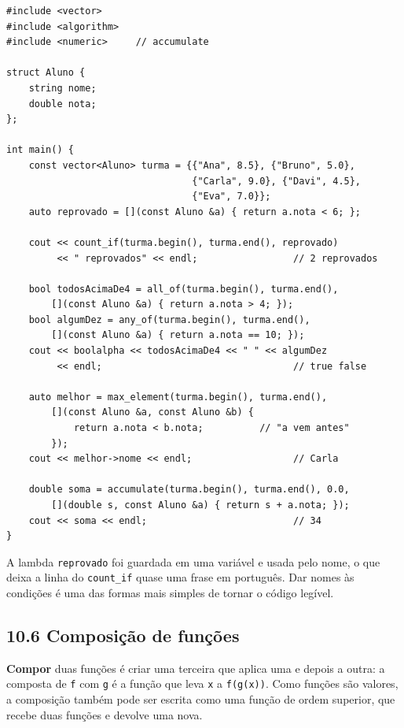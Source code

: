 \begin{codigo}
\begin{Verbatim}[breaklines=true, breaksymbolleft={}, fontsize=\footnotesize]
#include <vector>
#include <algorithm>
#include <numeric>     // accumulate

struct Aluno {
    string nome;
    double nota;
};

int main() {
    const vector<Aluno> turma = {{"Ana", 8.5}, {"Bruno", 5.0},
                                 {"Carla", 9.0}, {"Davi", 4.5},
                                 {"Eva", 7.0}};
    auto reprovado = [](const Aluno &a) { return a.nota < 6; };

    cout << count_if(turma.begin(), turma.end(), reprovado)
         << " reprovados" << endl;                 // 2 reprovados

    bool todosAcimaDe4 = all_of(turma.begin(), turma.end(),
        [](const Aluno &a) { return a.nota > 4; });
    bool algumDez = any_of(turma.begin(), turma.end(),
        [](const Aluno &a) { return a.nota == 10; });
    cout << boolalpha << todosAcimaDe4 << " " << algumDez
         << endl;                                  // true false

    auto melhor = max_element(turma.begin(), turma.end(),
        [](const Aluno &a, const Aluno &b) {
            return a.nota < b.nota;          // "a vem antes"
        });
    cout << melhor->nome << endl;                  // Carla

    double soma = accumulate(turma.begin(), turma.end(), 0.0,
        [](double s, const Aluno &a) { return s + a.nota; });
    cout << soma << endl;                          // 34
}
\end{Verbatim}
\end{codigo}

A lambda \texttt{reprovado} foi guardada em uma variável e usada pelo nome, o que deixa a linha do \texttt{count\_if} quase uma frase em português. Dar nomes às condições é uma das formas mais simples de tornar o código legível.

\subsection{10.6 Composição de funções}

\textbf{Compor} duas funções é criar uma terceira que aplica uma e depois a outra: a composta de \texttt{f} com \texttt{g} é a função que leva \texttt{x} a \texttt{f(g(x))}. Como funções são valores, a composição também pode ser escrita como uma função de ordem superior, que recebe duas funções e devolve uma nova.

